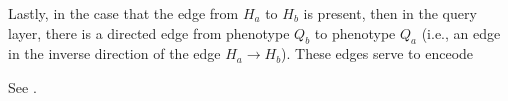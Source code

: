Lastly, in the case that the edge from $H_a$ to $H_b$ is present, then  in the
query layer, there is a directed edge from phenotype $Q_b$ to phenotype $Q_a$ (i.e., an edge in the
inverse direction of the edge $H_a \to H_b$).
%
These edges serve to enceode

See .
%
\begin{figure}[h]
\newcommand{\itemlayer}{$I_1$/A, $I_2$/B}
\newcommand{\hiddenquerylayers}{$H_1$/C/$Q_1$/J, $H_2$/D/$Q_2$/K, $H_3$/E/$Q_3$/L, $H_4$/F/$Q_4$/M, $H_5$/G/$Q_5$/N, $H_6$/H/$Q_6$/O, $H_7$/I/$Q_7$/P}
%
    \label{fig:bauer-net}
\end{figure}
